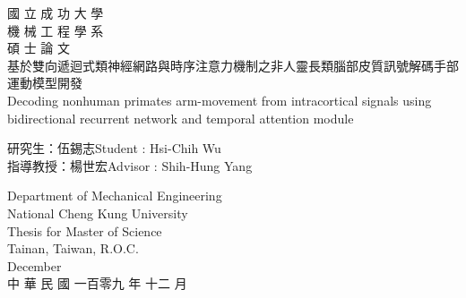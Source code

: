 {\Large
	\begin{center}
		\vspace*{0.1 cm}
		國 立 成 功 大 學\\
		\vspace{0.3 cm}
		機 械 工 程 學 系\\
		\vspace{0.3 cm}
		碩 士 論 文\\
		\vspace{1.5 cm}%
		基於雙向遞迴式類神經網路與時序注意力機制之非人靈長類腦部皮質訊號解碼手部運動模型開發\\
		\vspace{2.3 cm}
		Decoding nonhuman primates arm-movement from intracortical signals using bidirectional recurrent network and temporal attention module\\
		\vspace{2.3 cm}
	\end{center}
	\-\hspace{2cm}研\hspace{0.3 cm}究\hspace{0.3 cm}生：伍錫志\hspace{0.8 cm}Student : Hsi-Chih Wu\vspace{0.3 cm}\\
	\-\hspace{2cm}指導教授：楊世宏\hspace{0.8 cm}Advisor : Shih-Hung Yang\\
	\begin{center}
		\vspace{1.5 cm}
		Department of Mechanical Engineering\\	
		National Cheng Kung University\\	
		Thesis for Master of Science\\	
		Tainan, Taiwan, R.O.C.\\	
		December \\
		\vspace{1.5 cm}
		中 華 民 國 一百零九 年 十二 月 %
	\end{center}
}